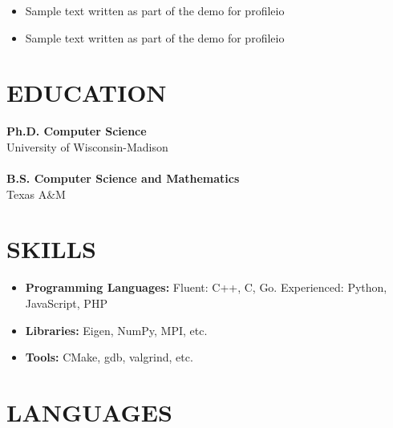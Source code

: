 \documentclass{res}
\begin{document}
\begin{resume}
\begin{itemize}[leftmargin=\parindent]
	\item Sample text written as part of the demo for profileio
	\item Sample text written as part of the demo for profileio
	\end{itemize}
	
	
	
	\section{\MakeUppercase{Education}} \vskip 0.15in
	
	{\bf Ph.D. Computer Science} \hfill  \\
	{University of Wisconsin-Madison \hfill } \\ \\
	{\bf B.S. Computer Science and Mathematics} \hfill  \\
	{Texas A\&M \hfill } 
	
	
	
	\section{\MakeUppercase{Skills}} \vskip 0.35in
	\begin{itemize}[leftmargin=\parindent]
	\setlength{\itemsep}{6pt}
	
		\item[] {\bf Programming Languages:} Fluent: C++, C, Go. Experienced: Python, JavaScript, PHP
		\item[] {\bf Libraries:} Eigen, NumPy, MPI, etc.
		\item[] {\bf Tools:} CMake, gdb, valgrind, etc.
	\end{itemize}
	
		
	
	
	
	\section{\MakeUppercase{Languages}} \vskip 0.35in
	

\end{resume}
\end{document}
